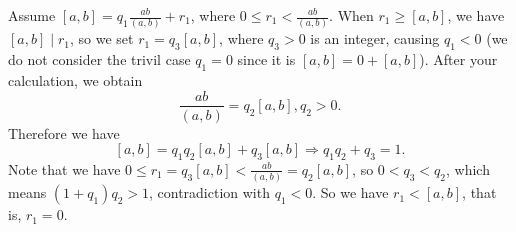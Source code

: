 \documentclass[a4paper,12pt]{article}
\begin{document}
    Assume $[a,b]=q_1\frac{ab}{(a,b)}+r_1$, where $0\le r_1<\frac{ab}{(a,b)}$. 
    When $r_1\ge[a,b]$, we have $[a,b]\mid r_1$, so we set $r_1=q_3[a,b]$, where $q_3>0$ is an integer, causing $q_1<0$ (we do not consider the trivil case $q_1=0$ since it is $[a,b]=0+[a,b]$). 
    After your calculation, we obtain
    \[\frac{ab}{(a,b)}=q_2[a,b], q_2>0.\]
    Therefore we have 
    \[[a,b]=q_1q_2[a,b]+q_3[a,b]\Rightarrow q_1q_2+q_3=1.\]
    Note that we have $0\le r_1=q_3[a,b]<\frac{ab}{(a,b)}=q_2[a,b]$, so $0<q_3<q_2$, which means $(1+q_1)q_2>1$, contradiction with $q_1<0$.
    So we have $r_1<[a,b]$, that is, $r_1=0$.
\end{document}
